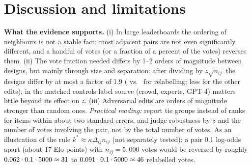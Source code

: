 \documentclass{article}
\newcommand{\nij}{n_{ij}}
\newcommand{\kstar}{k^\ast}
\begin{document}
\section{Discussion and limitations}\label{sec:disc}
\textbf{What the evidence supports.} (i) In large leaderboards the ordering of neighbours is not a stable fact: most adjacent pairs are not even significantly different, and a handful of votes (or a fraction of a percent of the votes) reverses them. (ii) The vote fraction needed differs by 1--2 orders of magnitude between designs, but mainly through size and separation: after dividing by $z\sqrt{\nij}$ the designs differ by at most a factor of 1.9 (\Nphimaxrelabel{} vs.\ \Nphiminrelabel{} for relabelling; less for the other edits); in the matched controls label source (crowd, experts, GPT-4) matters little beyond its effect on $z$. (iii) Adversarial edits are orders of magnitude stronger than random ones. \emph{Practical reading:} report tie groups instead of ranks for items within about two standard errors, and judge robustness by $z$ and the number of votes involving the pair, not by the total number of votes. As an illustration of the rule $\kstar\approx\kappa\Delta_{ij}\nij$ (not separately tested): a pair 0.1 log-odds apart (about 17 Elo points) with $\nij=5{,}000$ votes would be reversed by roughly $0.062\cdot0.1\cdot5000\approx 31$ to $0.091\cdot0.1\cdot5000\approx 46$ relabelled votes.
\end{document}
